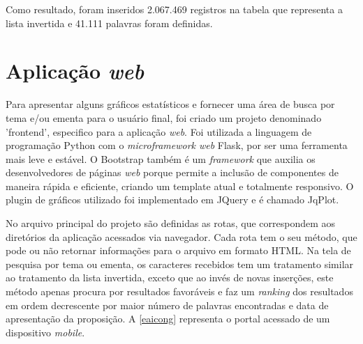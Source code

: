 \documentclass[
	12pt,				%
	openright,			%
	twoside,			%
	a4paper,			%
	english,			%
	french,				%
	spanish,			%
	brazil				%
	]{abntex2}
\begin{document}
{Como resultado, foram inseridos 2.067.469 registros na tabela que representa a lista invertida e 41.111 palavras foram definidas.

\section{Aplicação \emph{web}}
Para apresentar alguns gráficos estatísticos e fornecer uma área de busca por tema e/ou ementa para o usuário final, foi criado um projeto 
denominado 'frontend', especifico para a aplicação \emph{web}. Foi utilizada a linguagem de programação Python com o \emph{microframework web} Flask, por 
ser uma ferramenta mais leve e estável. O Bootstrap também é um \emph{framework} que auxilia os desenvolvedores de páginas \emph{web} 
porque permite a inclusão de componentes de maneira rápida e eficiente, criando um template atual e totalmente responsivo. O plugin 
de gráficos utilizado foi implementado em JQuery e é chamado JqPlot.

No arquivo principal do projeto são definidas as rotas, que correspondem aos diretórios da aplicação acessados via navegador. Cada rota 
tem o seu método, que pode ou não retornar informações para o arquivo em formato HTML. Na tela de pesquisa por tema ou ementa, os caracteres
recebidos tem um tratamento similar ao tratamento da lista invertida, exceto que ao invés de novas inserções, este método apenas
procura por resultados favoráveis e faz um \emph{ranking} dos resultados em ordem decrescente por maior número de palavras encontradas e data de apresentação
da proposição. A \autoref{eaicong} representa o portal acessado de um dispositivo \emph{mobile}.

}
\end{document}
